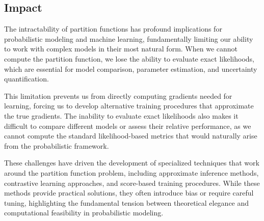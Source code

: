 \subsection{Impact}

The intractability of partition functions has profound implications for probabilistic modeling and machine learning, fundamentally limiting our ability to work with complex models in their most natural form. When we cannot compute the partition function, we lose the ability to evaluate exact likelihoods, which are essential for model comparison, parameter estimation, and uncertainty quantification.

This limitation prevents us from directly computing gradients needed for learning, forcing us to develop alternative training procedures that approximate the true gradients. The inability to evaluate exact likelihoods also makes it difficult to compare different models or assess their relative performance, as we cannot compute the standard likelihood-based metrics that would naturally arise from the probabilistic framework.

These challenges have driven the development of specialized techniques that work around the partition function problem, including approximate inference methods, contrastive learning approaches, and score-based training procedures. While these methods provide practical solutions, they often introduce bias or require careful tuning, highlighting the fundamental tension between theoretical elegance and computational feasibility in probabilistic modeling.





